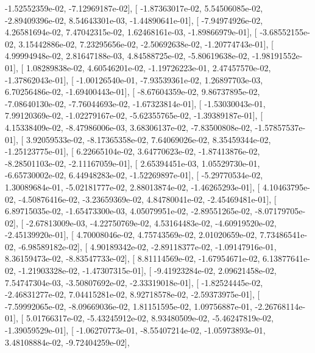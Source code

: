 \documentclass{article}
\begin{document}
         -1.52552359e-02,  -7.12969187e-02],
       [ -1.87363017e-02,   5.54506085e-02,  -2.89409396e-02,
          8.54643301e-03,  -1.44890641e-01],
       [ -7.94974926e-02,   4.26581694e-02,   7.47042315e-02,
          1.62468161e-03,  -1.89866979e-01],
       [ -3.68552155e-02,   3.15442886e-02,   7.23295656e-02,
         -2.50692638e-02,  -1.20774743e-01],
       [  4.99994948e-02,   2.81647188e-03,   4.84588725e-02,
         -5.80619638e-02,  -1.98191552e-01],
       [  1.08289838e-02,   4.60546201e-02,  -1.19726223e-01,
          2.47457570e-02,  -1.37862043e-01],
       [ -1.00126540e-01,  -7.93539361e-02,   1.26897703e-03,
          6.70256486e-02,  -1.69400443e-01],
       [ -8.67604359e-02,   9.86737895e-02,  -7.08640130e-02,
         -7.76044693e-02,  -1.67323814e-01],
       [ -1.53030043e-01,   7.99120369e-02,  -1.02279167e-02,
         -5.62355765e-02,  -1.39389187e-01],
       [  4.15338409e-02,  -8.47986006e-03,   3.68306137e-02,
         -7.83500808e-02,  -1.57857537e-01],
       [  3.92059533e-02,  -8.17365358e-02,   7.64069026e-02,
          8.35459344e-02,  -1.25123775e-01],
       [  6.22665104e-02,   3.64770623e-02,  -1.87413876e-02,
         -8.28501103e-02,  -2.11167059e-01],
       [  2.65394451e-03,   1.05529730e-01,  -6.65730002e-02,
          6.44948283e-02,  -1.52269897e-01],
       [ -5.29770534e-02,   1.30089684e-01,  -5.02181777e-02,
          2.88013874e-02,  -1.46265293e-01],
       [  4.10463795e-02,  -4.50876416e-02,  -3.23659369e-02,
          4.84780041e-02,  -2.45469481e-01],
       [  6.89715035e-02,  -1.65473300e-03,   4.05079951e-02,
         -2.89551265e-02,  -8.07179705e-02],
       [ -2.67813009e-03,  -4.22750769e-02,   4.53164483e-02,
         -4.60919520e-02,  -2.45139920e-01],
       [  4.70008046e-02,   4.75743569e-02,   2.01020659e-02,
          7.73486541e-02,  -6.98589182e-02],
       [  4.90189342e-02,  -2.89118377e-02,  -1.09147916e-01,
          8.36159473e-02,  -8.83547733e-02],
       [  8.81114569e-02,  -1.67954671e-02,   6.13877641e-02,
         -1.21903328e-02,  -1.47307315e-01],
       [ -9.41923284e-02,   2.09621458e-02,   7.54747304e-03,
         -3.50807692e-02,  -2.33319018e-01],
       [ -1.82524445e-02,  -2.46831277e-02,   7.04415281e-02,
          8.92718578e-02,  -2.59373975e-01],
       [ -7.59992065e-02,  -8.09669036e-02,   1.81151595e-02,
          1.09756887e-01,  -2.26768114e-01],
       [  5.01766317e-02,  -5.43245912e-02,   8.93480509e-02,
         -5.46247819e-02,  -1.39059529e-01],
       [ -1.06270773e-01,  -8.55407214e-02,  -1.05973893e-01,
          3.48108884e-02,  -9.72404259e-02],
\end{document}
